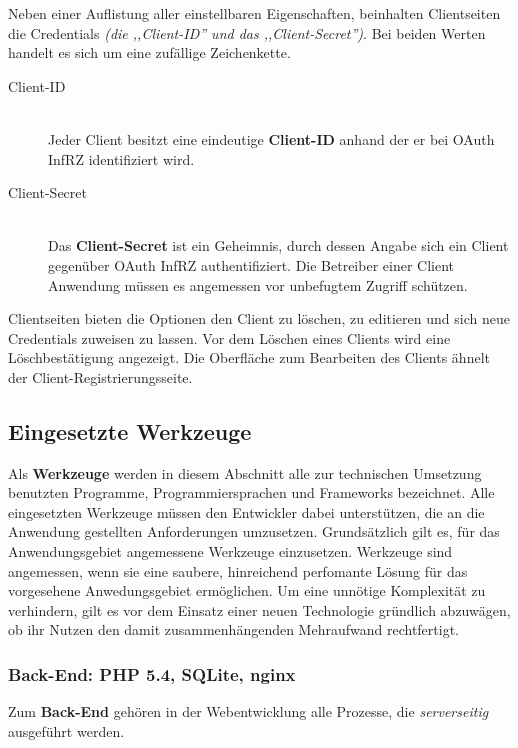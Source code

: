 \documentclass[12pt,a4paper,pointednumbers,abstracton]{scrartcl}
\begin{document}
Neben einer Auflistung aller einstellbaren Eigenschaften, beinhalten Clientseiten die Credentials \emph{(die ,,Client-ID'' und das ,,Client-Secret'')}. Bei beiden Werten handelt es sich um eine zufällige Zeichenkette.

\begin{description}
	\item[Client-ID] \hfill \\
		Jeder Client besitzt eine eindeutige \textbf{Client-ID} anhand der er bei OAuth InfRZ identifiziert wird.
	\item[Client-Secret] \hfill \\
		Das \textbf{Client-Secret} ist ein Geheimnis, durch dessen Angabe sich ein Client gegenüber OAuth InfRZ authentifiziert.
		Die Betreiber einer Client Anwendung müssen es angemessen vor unbefugtem Zugriff schützen.
\end{description}

Clientseiten bieten die Optionen den Client zu löschen, zu editieren und sich neue Credentials zuweisen zu lassen.
Vor dem Löschen eines Clients wird eine Löschbestätigung angezeigt.
Die Oberfläche zum Bearbeiten des Clients ähnelt der Client-Registrierungsseite.

\subsection{Eingesetzte Werkzeuge}
\label{sec:oauth-infrz/used-tools}

Als \textbf{Werkzeuge} werden in diesem Abschnitt alle zur technischen Umsetzung benutzten Programme, Programmiersprachen und Frameworks bezeichnet.
Alle eingesetzten Werkzeuge müssen den Entwickler dabei unterstützen, die an die Anwendung gestellten Anforderungen umzusetzen.
Grundsätzlich gilt es, für das Anwendungsgebiet angemessene Werkzeuge einzusetzen.
Werkzeuge sind angemessen, wenn sie eine saubere, hinreichend perfomante Lösung für das vorgesehene Anwedungsgebiet ermöglichen.
Um eine unnötige Komplexität zu verhindern, gilt es vor dem Einsatz einer neuen Technologie gründlich abzuwägen, ob ihr Nutzen den damit zusammenhängenden Mehraufwand rechtfertigt.

\subsubsection{Back-End: PHP 5.4, SQLite, nginx}
\label{sec:oauth-infrz/back-end}

Zum \textbf{Back-End} gehören in der Webentwicklung alle Prozesse, die \emph{serverseitig} ausgeführt werden.
\end{document}
